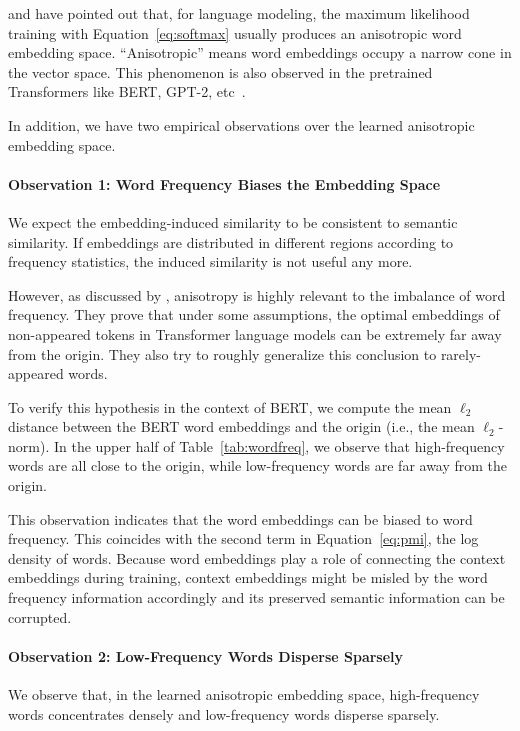 \documentclass[11pt,a4paper]{article}
\begin{document}
\citet{gao2019representation} and \citet{wang2020spectrum} have pointed out that, for language modeling, the maximum likelihood training with Equation~\ref{eq:softmax} usually produces an anisotropic word embedding space. ``Anisotropic'' means word embeddings occupy a narrow cone in the vector space.
This phenomenon is also observed in the pretrained Transformers like BERT, GPT-2, etc~\cite{ethayarajh2019contextual}. 

In addition, we have two empirical observations over the learned anisotropic embedding space.

\paragraph{Observation 1: Word Frequency Biases the Embedding Space} 
\label{sec:h1}


We expect the embedding-induced similarity to be consistent to semantic similarity. If embeddings are distributed in different regions according to frequency statistics, the induced similarity is not useful any more.

However, as discussed by \citet{gao2019representation}, anisotropy is highly relevant to the imbalance of word frequency. They prove that under some assumptions, the optimal embeddings of non-appeared tokens in Transformer language models can be extremely far away from the origin. They also try to roughly generalize this conclusion to rarely-appeared words. 


To verify this hypothesis in the context of BERT, we compute the mean $\ell_2$ distance between the BERT word embeddings and the origin (i.e., the mean $\ell_2$-norm). In the upper half of Table~\ref{tab:wordfreq}, we observe that high-frequency words are all close to the origin, while low-frequency words are far away from the origin.


This observation indicates that the word embeddings can be biased to word frequency. This coincides with the second term in Equation~\ref{eq:pmi}, the log density of words. 
Because word embeddings play a role of connecting the context embeddings during training, context embeddings might be misled by the word frequency information accordingly and its preserved semantic information can be corrupted.


\paragraph{Observation 2: Low-Frequency Words Disperse Sparsely} 
\label{sec:h2}
We observe that, in the learned anisotropic embedding space, high-frequency words concentrates densely and low-frequency words disperse sparsely. 
\end{document}
